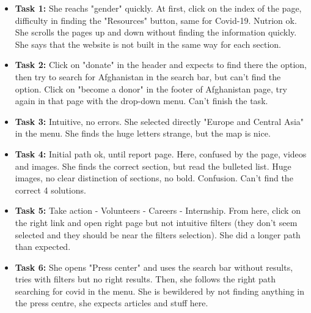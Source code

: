\begin{itemize}
    \item \textbf{Task 1:} She reachs "gender" quickly. At first, click on the index of the page, difficulty in finding the "Resources" button, same for Covid-19. Nutrion ok. She scrolls the pages up and down without finding the information quickly. She says that the website is not built in the same way for each section.
    \item \textbf{Task 2:} Click on "donate" in the header and expects to find there the option, then try to search for Afghanistan in the search bar, but can't find the option. Click on "become a donor" in the footer of Afghanistan page, try again in that page with the drop-down menu. Can't finish the task.
    \item \textbf{Task 3:} Intuitive, no errors. She selected directly "Europe and Central Asia" in the menu. She finds the huge letters strange, but the map is nice.
    \item \textbf{Task 4:} Initial path ok, until report page. Here, confused by the page, videos and images. She finds the correct section, but read the bulleted list. Huge images, no clear distinction of sections, no bold. Confusion. Can't find the correct 4 solutions.
    \item \textbf{Task 5:} Take action - Volunteers - Careers - Internship. From here, click on the right link and open right page but not intuitive filters (they don't seem selected and they should be near the filters selection). She did a longer path than expected.
    \item \textbf{Task 6:} She opens "Press center" and uses the search bar without results, tries with filters but no right results. Then, she follows the right path searching for covid in the menu. She is bewildered by not finding anything in the press centre, she expects articles and stuff here.
\end{itemize}





\vspace{1cm}

